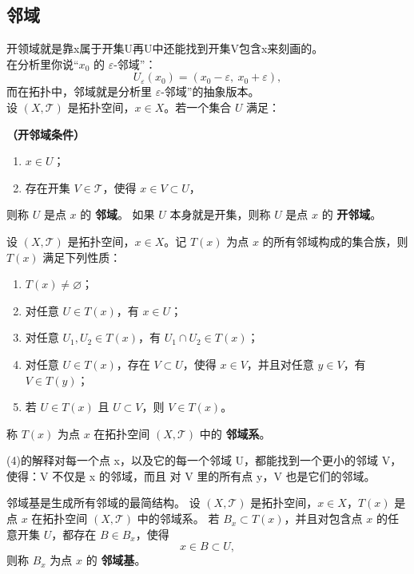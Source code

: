 \subsection{邻域}
\begin{definition}
开领域就是靠x属于开集U再U中还能找到开集V包含x来刻画的。\\
在分析里你说“$x_0$ 的 $\varepsilon$-邻域”：
\[
U_\varepsilon(x_0) = (x_0 - \varepsilon,\ x_0 + \varepsilon),
\]
而在拓扑中，邻域就是分析里 $\varepsilon$-邻域”的抽象版本。\\
设 $(X,\mathcal{T})$ 是拓扑空间，$x \in X$。若一个集合 $U$ 满足：

\textbf{（开邻域条件）}
\begin{enumerate}
  \item $x \in U$；
  \item 存在开集 $V \in \mathcal{T}$，使得 $x \in V \subset U$，
\end{enumerate}

则称 $U$ 是点 $x$ 的 \textbf{邻域}。  
如果 $U$ 本身就是开集，则称 $U$ 是点 $x$ 的 \textbf{开邻域}。
\end{definition}
\begin{definition}
设 $(X,\mathcal{T})$ 是拓扑空间，$x \in X$。记 $T(x)$ 为点 $x$ 的所有邻域构成的集合族，则 $T(x)$ 满足下列性质：
\begin{enumerate}
  \item $T(x) \neq \varnothing$；
  \item 对任意 $U \in T(x)$，有 $x \in U$；
  \item 对任意 $U_1,U_2 \in T(x)$，有 $U_1 \cap U_2 \in T(x)$；
  \item 对任意 $U \in T(x)$，存在 $V \subset U$，使得 $x \in V$，并且对任意 $y \in V$，有 $V \in T(y)$；
  \item 若 $U \in T(x)$ 且 $U \subset V$，则 $V \in T(x)$。
\end{enumerate}
称 $T(x)$ 为点 $x$ 在拓扑空间 $(X,\mathcal{T})$ 中的 \textbf{邻域系}。
\end{definition}
(4)的解释对每一个点 x，以及它的每一个邻域 U，都能找到一个更小的邻域 V，
使得：V 不仅是 x 的邻域，而且 对 V 里的所有点 y，V 也是它们的邻域。
\begin{definition}
邻域基是生成所有邻域的最简结构。
设 $(X,\mathcal{T})$ 是拓扑空间，$x \in X$，$T(x)$ 是点 $x$ 在拓扑空间 $(X,\mathcal{T})$ 中的邻域系。  
若 $B_x \subset T(x)$，并且对包含点 $x$ 的任意开集 $U$，都存在 $B \in B_x$，使得
\[
x \in B \subset U,
\]
则称 $B_x$ 为点 $x$ 的 \textbf{邻域基}。
\end{definition}

